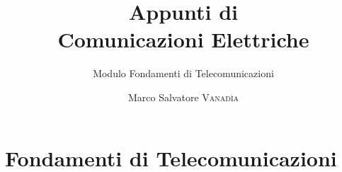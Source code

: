 \documentclass[10pt,a4paper,onecolumn,titlepage,twoside,openright,final]{book}
\title{Appunti di \\ Comunicazioni Elettriche}
\subtitle{Modulo Fondamenti di Telecomunicazioni}
\author{Marco Salvatore \textsc{Vanadìa}}
\begin{document}
\frontmatter
\maketitle

\cleardoublepage\clearpage{\pagestyle{empty}\cleardoublepage}
\tableofcontents



\mainmatter

\part{Fondamenti di Telecomunicazioni}








{}

\printindex
%
\end{document}
